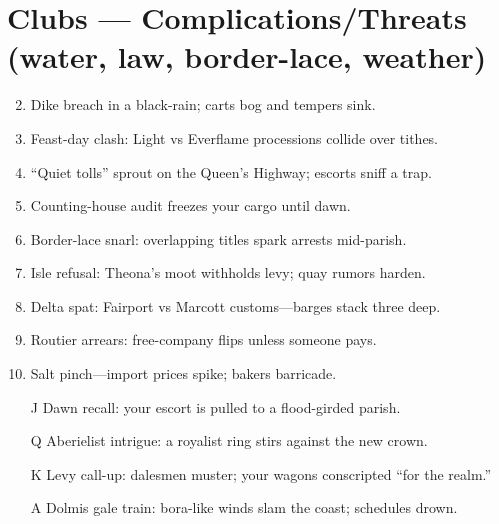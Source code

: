 \section*{Clubs --- Complications/Threats (water, law, border-lace, weather)}
\begin{enumerate}
\setcounter{enumi}{1}
\item Dike breach in a black-rain; carts bog and tempers sink.
\item Feast-day clash: Light vs Everflame processions collide over tithes.
\item ``Quiet tolls'' sprout on the Queen's Highway; escorts sniff a trap.
\item Counting-house audit freezes your cargo until dawn.
\item Border-lace snarl: overlapping titles spark arrests mid-parish.
\item Isle refusal: Theona's moot withholds levy; quay rumors harden.
\item Delta spat: Fairport vs Marcott customs---barges stack three deep.
\item Routier arrears: free-company flips unless someone pays.
\item Salt pinch---import prices spike; bakers barricade.
\item[J] Dawn recall: your escort is pulled to a flood-girded parish.
\item[Q] Aberielist intrigue: a royalist ring stirs against the new crown.
\item[K] Levy call-up: dalesmen muster; your wagons conscripted ``for the realm.''
\item[A] Dolmis gale train: bora-like winds slam the coast; schedules drown.
\end{enumerate}


